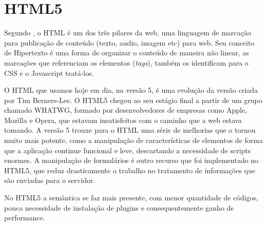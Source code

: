\section{HTML5}
	\par Segundo , o HTML é um dos três pilares da web, uma linguagem de marcação para publicação de conteúdo (texto, audio, imagem etc) para web. Seu conceito de Hipertexto é uma forma de organizar o conteúdo de maneira não linear, as marcações que referenciam os elementos (\textit{tags}), também os identificam para o CSS e o Javascript tratá-los. 
	\par O HTML que usamos hoje em dia, na versão 5, é uma evolução da versão criada por Tim Berners-Lee. O HTML5 chegou ao seu estágio final a partir de um grupo chamado WHATWG, formado por desenvolvedores de empresas como Apple, Mozilla e Opera, que estavam insatisfeitos com o caminho que a web estava tomando. A versão 5 trouxe para o HTML uma série de melhorias que o tornou muito mais potente, como a manipulação de características de elementos de forma que a aplicação continue funcional e leve, descartando a necessidade de scripts enormes. A manipulação de formulários é outro recurso que foi implementado no HTML5, que reduz drasticamente o trabalho no tratamento de informações que são enviadas para o servidor.
	\par No HTML5 a semântica se faz mais presente, com menor quantidade de códigos, pouca necessidade de instalação de plugins e consequentemente ganho de performance.
	
